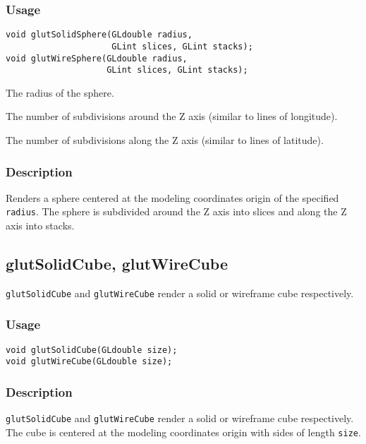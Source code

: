 \subsubsection*{Usage}
\begin{verbatim}
void glutSolidSphere(GLdouble radius,
                     GLint slices, GLint stacks);
void glutWireSphere(GLdouble radius,
                    GLint slices, GLint stacks);
\end{verbatim}
\begin{description}
\itemsep 0in
\item[\tt radius]
The radius of the sphere.
\item[\tt slices]
The number of subdivisions around the Z axis (similar to lines of longitude).
\item[\tt stacks]
The number of subdivisions along the Z axis (similar to lines of latitude).
\end{description}

\subsubsection*{Description}

Renders a sphere centered at the modeling coordinates origin of the specified {\tt radius}.
The sphere is subdivided around the Z axis into slices and along the Z
axis into stacks.

\subsection{glutSolidCube, glutWireCube}

{\tt glutSolidCube} and {\tt glutWireCube} render a solid or wireframe
cube respectively.

\subsubsection*{Usage}
\begin{verbatim}
void glutSolidCube(GLdouble size);
void glutWireCube(GLdouble size);
\end{verbatim}

\subsubsection*{Description}

{\tt glutSolidCube} and {\tt glutWireCube} render a solid or wireframe
cube respectively.
The cube is centered at the modeling coordinates origin with sides of length {\tt size}.

